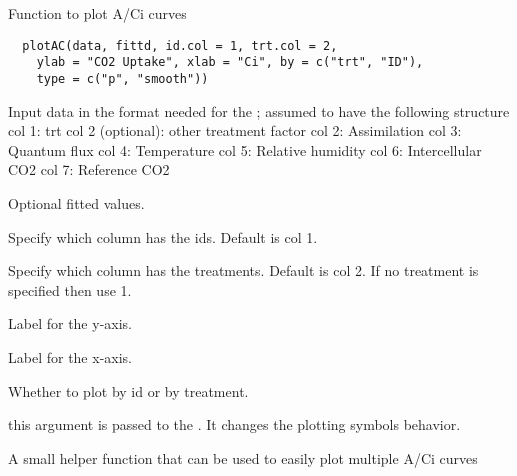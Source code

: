 \documentclass[letterpaper]{book}
\begin{document}
%
\begin{SeeAlso}\relax
{} 
\end{SeeAlso}
%
\begin{Description}\relax
Function to plot A/Ci curves
\end{Description}
%
\begin{Usage}
\begin{verbatim}
  plotAC(data, fittd, id.col = 1, trt.col = 2,
    ylab = "CO2 Uptake", xlab = "Ci", by = c("trt", "ID"),
    type = c("p", "smooth"))
\end{verbatim}
\end{Usage}
%
\begin{Arguments}
\begin{ldescription}
\item[\code{data}] Input data in the format needed for the
; assumed to have the following
structure col 1: trt col 2 (optional): other treatment
factor col 2: Assimilation col 3: Quantum flux col 4:
Temperature col 5: Relative humidity col 6: Intercellular
CO2 col 7: Reference CO2

\item[\code{fittd}] Optional fitted values.

\item[\code{id.col}] Specify which column has the ids. Default
is col 1.

\item[\code{trt.col}] Specify which column has the treatments.
Default is col 2. If no treatment is specified then use
1.

\item[\code{ylab}] Label for the y-axis.

\item[\code{xlab}] Label for the x-axis.

\item[\code{by}] Whether to plot by id or by treatment.

\item[\code{type}] this argument is passed to the
. It changes the plotting symbols
behavior.
\end{ldescription}
\end{Arguments}
%
\begin{Details}\relax
A small helper function that can be used to easily plot
multiple A/Ci curves
\end{Details}
\end{document}
